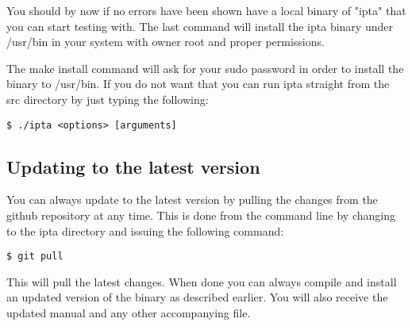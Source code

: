 \documentclass[english,twoside,openright,a4paper,12pt]{article}
\begin{document}
You should by now if no errors have been shown have a local binary of
"ipta" that you can start testing with. The last command will install
the ipta binary under /usr/bin in your system with owner root and
proper permissions.

The make install command will ask for your sudo password in order to 
install the binary to /usr/bin. If you do not want that you can run 
ipta straight from the src directory by just typing the following:

\begin{verbatim}
$ ./ipta <options> [arguments]
\end{verbatim}

\subsection{Updating to the latest version}

You can always update to the latest version by pulling the changes 
from the github repository at any time. This is done from the command 
line by changing to the ipta directory and issuing the following 
command:

\begin{verbatim}
$ git pull
\end{verbatim}

This will pull the latest changes. When done you can always compile 
and install an updated version of the binary as described earlier. 
You will also receive the updated manual and any other accompanying 
file.
\end{document}
